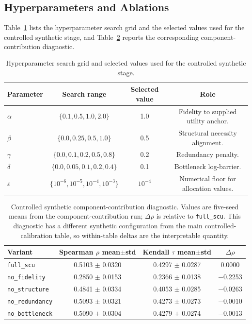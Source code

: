 \documentclass[a4paper,fleqn]{cas-sc}
\begin{document}
\subsection{Hyperparameters and Ablations}
\label{app:hyperparameters-ablation}

Table~\ref{tab:supp-hyperparameters} lists the hyperparameter search grid and the selected values used for the controlled synthetic stage, and Table~\ref{tab:supp-ablation} reports the corresponding component-contribution diagnostic.

\begin{table}[ht]
\caption{Hyperparameter search grid and selected values used for the controlled synthetic stage.}
\label{tab:supp-hyperparameters}
\centering
\small
\begin{tabular}{lccc}
\toprule
\textbf{Parameter} & \textbf{Search range} & \textbf{Selected value} & \textbf{Role} \\
\midrule
$\alpha$ & $\{0.1,0.5,1.0,2.0\}$ & 1.0 & Fidelity to supplied utility anchor. \\
$\beta$ & $\{0.0,0.25,0.5,1.0\}$ & 0.5 & Structural necessity alignment. \\
$\gamma$ & $\{0.0,0.1,0.2,0.5,0.8\}$ & 0.2 & Redundancy penalty. \\
$\delta$ & $\{0.0,0.05,0.1,0.2,0.4\}$ & 0.1 & Bottleneck log-barrier. \\
$\varepsilon$ & $\{10^{-6},10^{-5},10^{-4},10^{-3}\}$ & $10^{-4}$ & Numerical floor for allocation values. \\
\bottomrule
\end{tabular}
\end{table}

\begin{table}[ht]
\caption{Controlled synthetic component-contribution diagnostic. Values are five-seed means from the component-contribution run; $\Delta\rho$ is relative to \texttt{full\_scu}. This diagnostic has a different synthetic configuration from the main controlled-calibration table, so within-table deltas are the interpretable quantity.}
\label{tab:supp-ablation}
\centering
\small
\begin{tabular}{lccc}
\toprule
\textbf{Variant} & \textbf{Spearman $\rho$ mean$\pm$std} & \textbf{Kendall $\tau$ mean$\pm$std} & \textbf{$\Delta\rho$} \\
\midrule
\texttt{full\_scu} & 0.5103 $\pm$ 0.0320 & 0.4297 $\pm$ 0.0287 & 0.0000 \\
\texttt{no\_fidelity} & 0.2850 $\pm$ 0.0153 & 0.2366 $\pm$ 0.0138 & $-$0.2253 \\
\texttt{no\_structure} & 0.4841 $\pm$ 0.0334 & 0.4053 $\pm$ 0.0285 & $-$0.0263 \\
\texttt{no\_redundancy} & 0.5093 $\pm$ 0.0321 & 0.4273 $\pm$ 0.0273 & $-$0.0010 \\
\texttt{no\_bottleneck} & 0.5090 $\pm$ 0.0304 & 0.4279 $\pm$ 0.0274 & $-$0.0013 \\
\bottomrule
\end{tabular}
\end{table}
\end{document}
